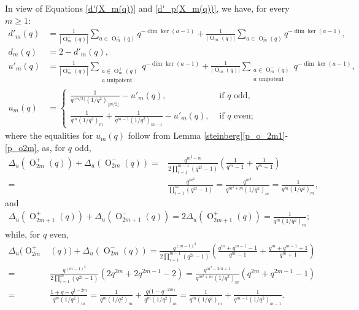 \documentclass[a4paper, 12pt, oneside]{amsart}
\theoremstyle{definition}
\DeclareMathOperator{\Or}{O}
\begin{document}
In view of Equations \eqref{d'(X_m(q))} and \eqref{d'_p(X_m(q))}, we have, for every $m \ge 1$:
\begin{align}
\nonumber
d'_m(q)&=\frac{1}{|\Or^{+}_{m}(q)|}\sum_{a \in \Or^{+}_{m}(q)}q^{-\dim \ker(a-1)}+\frac{1}{|\Or^{-}_{m}(q)|}\sum_{a \in \Or^{-}_{m}(q)}q^{-\dim \ker(a-1)}, \\
\nonumber
d_m(q)&=2-d'_m(q), \\
\nonumber
 u'_m(q)&=\frac{1}{|\Or^{+}_{m}(q)|}\sum_{\substack{a \in \Or^{+}_{m}(q) \\ a \text{ unipotent}}}q^{-\dim \ker(a-1)}+\frac{1}{|\Or^{-}_{m}(q)|}\sum_{\substack{a \in \Or^{-}_{m}(q) \\ a \text{ unipotent}}}q^{-\dim \ker(a-1)}, \\
 \label{sum_unip_qeven}
 u_m(q)&=
 \begin{cases}\frac{1}{q^{\lfloor m/2\rfloor}(1/q^2)_{\lfloor m/2 \rfloor}}-u'_m(q), & \text{ if }q \text{ odd}, \\
 \frac{1}{q^m(1/q^2)_m}+\frac{1}{q^{m-1}(1/q^2)_{m-1}}-u'_m(q), & \text{ if } q \text{ even};
 \end{cases}
\end{align}
where the equalities for $u_m(q)$ follow from Lemma \ref{steinberg}\eqref{p_o_2m1}-\eqref{p_o2m}, as, for $q$ odd,
\begin{align*}
\Delta_u(\Or^{+}_{2m}(q))+\Delta_u(\Or^{-}_{2m}(q))=& \frac{q^{m^2-m}}{2\prod_{i=1}^{m-1}(q^{2i}-1)}\left(\frac{1}{q^m-1}+\frac{1}{q^m +1}\right)\\
=&\frac{q^{m^2}}{\prod_{i=1}^{m}(q^{2i}-1)}=\frac{q^{m^2}}{q^{m^2+m}(1/q^2)_m}=\frac{1}{q^m(1/q^2)_m},
\end{align*}
and
\begin{align*}
\Delta_u(\Or^{+}_{2m+1}(q))+\Delta_u(\Or^{-}_{2m+1}(q))=2\Delta_u(\Or^{+}_{2m+1}(q))=\frac{1}{q^m(1/q^2)_m};
\end{align*}
while, for $q$ even,
\begin{align*}
\Delta_u(\Or^{+}_{2m}&(q))+\Delta_u(\Or^{-}_{2m}(q))=\frac{q^{(m-1)^2}}{2\prod_{i=1}^{m-1}(q^{2i}-1)}\left( \frac{q^m+q^{m-1}-1}{q^m-1}+\frac{q^m+q^{m-1}+1}{q^m+1}\right)\\
=&\frac{q^{(m-1)^2}}{2\prod_{i=1}^{m}(q^{2i}-1)}\left(2q^{2m}+2q^{2m-1}-2\right)=\frac{q^{m^2-2m+1}}{q^{m^2+m}(1/q^2)_m}\left(q^{2m}+q^{2m-1}-1\right) \\
=&\frac{1+q-q^{1-2m}}{q^{m}(1/q^2)_m}=\frac{1}{q^m(1/q^2)_m}+\frac{q(1-q^{-2m)}}{q^m(1/q^2)_m}
=\frac{1}{q^m(1/q^2)_m}+\frac{1}{q^{m-1}(1/q^2)_{m-1}}.
\end{align*}
\end{document}
